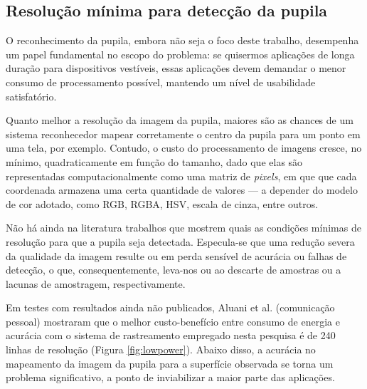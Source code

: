 \documentclass[12pt]{article}
\begin{document}
		\subsection{Resolução mínima para detecção da pupila}
		O reconhecimento da pupila, embora não seja o foco deste trabalho, desempenha um papel fundamental no escopo do problema: se quisermos aplicações de longa duração para dispositivos vestíveis, essas aplicações devem demandar o menor consumo de processamento possível, mantendo um nível de usabilidade satisfatório.
		
		Quanto melhor a resolução da imagem da pupila, maiores são as chances de um sistema reconhecedor mapear corretamente o centro da pupila para um ponto em uma tela, por exemplo. Contudo, o custo do processamento de imagens cresce, no mínimo, quadraticamente em função do tamanho, dado que elas são representadas computacionalmente como uma matriz de \textit{pixels}, em que que cada coordenada armazena uma certa quantidade de valores --- a depender do modelo de cor adotado, como RGB, RGBA, HSV, escala de cinza, entre outros.
		
		Não há ainda na literatura trabalhos que mostrem quais as condições mínimas de resolução para que a pupila seja detectada. Especula-se que uma redução severa da qualidade da imagem resulte ou em perda sensível de acurácia ou falhas de detecção, o que, consequentemente, leva-nos ou ao descarte de amostras ou a lacunas de amostragem, respectivamente.
				
		Em testes com resultados ainda não publicados, Aluani et al. (comunicação pessoal) mostraram que o melhor custo-benefício entre consumo de energia e acurácia com o sistema de rastreamento empregado nesta pesquisa \cite{Kassner-2014} é de 240 linhas de resolução (Figura \ref{fig:lowpower}). Abaixo disso, a acurácia no mapeamento da imagem da pupila para a superfície observada se torna um problema significativo, a ponto de inviabilizar a maior parte das aplicações. 
		
\end{document}
